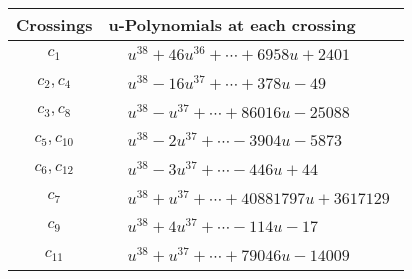\documentclass[1p]{elsarticle_modified}
\theoremstyle{definition}
\begin{document}
\begin{tabular}{m{50pt}|m{274pt}}
Crossings & \hspace{64pt}u-Polynomials at each crossing \\
\hline $$\begin{aligned}c_{1}\end{aligned}$$&$\begin{aligned}
&u^{38}+46 u^{36}+\cdots+6958 u+2401
\end{aligned}$\\
\hline $$\begin{aligned}c_{2},c_{4}\end{aligned}$$&$\begin{aligned}
&u^{38}-16 u^{37}+\cdots+378 u-49
\end{aligned}$\\
\hline $$\begin{aligned}c_{3},c_{8}\end{aligned}$$&$\begin{aligned}
&u^{38}- u^{37}+\cdots+86016 u-25088
\end{aligned}$\\
\hline $$\begin{aligned}c_{5},c_{10}\end{aligned}$$&$\begin{aligned}
&u^{38}-2 u^{37}+\cdots-3904 u-5873
\end{aligned}$\\
\hline $$\begin{aligned}c_{6},c_{12}\end{aligned}$$&$\begin{aligned}
&u^{38}-3 u^{37}+\cdots-446 u+44
\end{aligned}$\\
\hline $$\begin{aligned}c_{7}\end{aligned}$$&$\begin{aligned}
&u^{38}+u^{37}+\cdots+40881797 u+3617129
\end{aligned}$\\
\hline $$\begin{aligned}c_{9}\end{aligned}$$&$\begin{aligned}
&u^{38}+4 u^{37}+\cdots-114 u-17
\end{aligned}$\\
\hline $$\begin{aligned}c_{11}\end{aligned}$$&$\begin{aligned}
&u^{38}+u^{37}+\cdots+79046 u-14009
\end{aligned}$\\
\hline
\end{tabular}\\~\\
\end{document}
